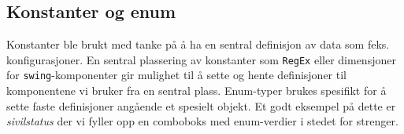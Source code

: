 \subsection{Konstanter og enum}
Konstanter ble brukt med tanke på å ha en sentral definisjon av data som feks. konfigurasjoner. En sentral plassering av konstanter som \texttt{RegEx} eller dimensjoner for \texttt{swing}-komponenter gir mulighet til å sette og hente definisjoner til komponentene vi bruker fra en sentral plass. Enum-typer brukes spesifikt for å sette faste definisjoner angående et spesielt objekt. Et godt eksempel på dette er \textit{sivilstatus} der vi fyller opp en comboboks med enum-verdier i stedet for strenger. 